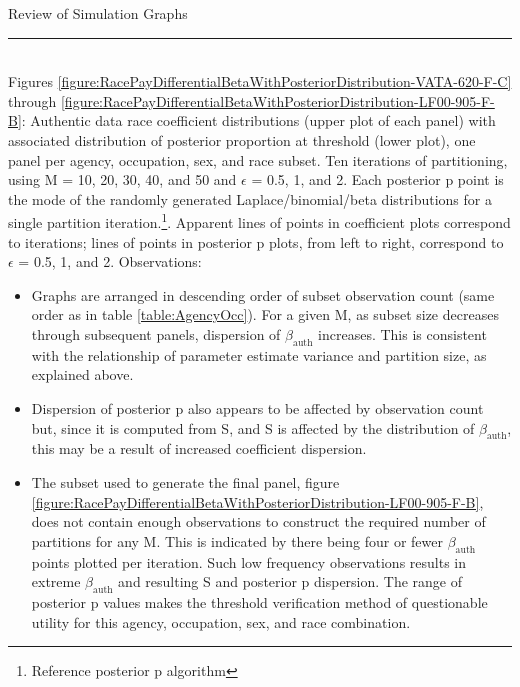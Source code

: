\documentclass[10pt, letterpaper]{article}
\begin{document}
\begin{spacing}{1.0}
\vspace{20pt}

Review of Simulation Graphs\\[-8pt]
\noindent\rule{\textwidth}{0.5pt}\\[-6.25pt]

Figures \ref{figure:RacePayDifferentialBetaWithPosteriorDistribution-VATA-620-F-C} through \ref{figure:RacePayDifferentialBetaWithPosteriorDistribution-LF00-905-F-B}:  Authentic data race coefficient distributions (upper plot of each panel) with associated distribution of posterior proportion at threshold (lower plot), one panel per agency, occupation, sex, and race subset.  Ten iterations of partitioning, using M = 10, 20, 30, 40, and 50 and $\epsilon$ = 0.5, 1, and 2.  Each posterior p point is the mode of the randomly generated Laplace/binomial/beta distributions for a single partition iteration.\footnote{Reference posterior p algorithm}.  Apparent lines of points in coefficient plots correspond to iterations; lines of points in posterior p plots, from left to right, correspond to $\epsilon$ = 0.5, 1, and 2.   Observations:

\begin{itemize}
    \item Graphs are arranged in descending order of subset observation count (same order as in table \ref{table:AgencyOcc}).  For a given M, as subset size decreases through subsequent panels, dispersion of $\beta_\text{auth}$ increases.  This is consistent with the relationship of parameter estimate variance and partition size, as explained above.
    
    \item Dispersion of posterior p also appears to be affected by observation count but, since it is computed from S, and S is affected by the distribution of $\beta_\text{auth}$, this may be a result of increased coefficient dispersion.
    
    \item The subset used to generate the final panel, figure \ref{figure:RacePayDifferentialBetaWithPosteriorDistribution-LF00-905-F-B}, does not contain enough observations to construct the required number of partitions for any M.  This is indicated by there being four or fewer $\beta_\text{auth}$ points plotted per iteration.  Such low frequency observations results in extreme $\beta_\text{auth}$ and resulting S and posterior p dispersion.  The range of posterior p values makes the threshold verification method of questionable utility for this agency, occupation, sex, and race combination.
    

\end{itemize}
\end{spacing}
\end{document}
